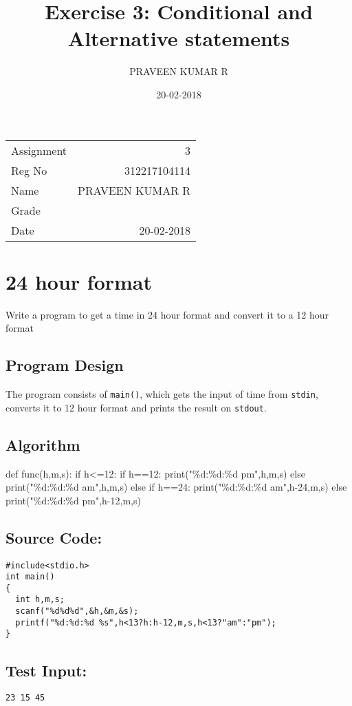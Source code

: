 \documentclass[11pt]{article}
\author{PRAVEEN KUMAR R}
\date{20-02-2018}
\title{Exercise 3: Conditional and Alternative statements}
\begin{document}
\maketitle
\begin{center}
\begin{tabular}{lr}
Assignment & 3\\
Reg No & 312217104114\\
Name & PRAVEEN KUMAR R\\
Grade & \\
Date & 20-02-2018\\
\end{tabular}
\end{center}


\section{24 hour format}
\label{sec-1}
Write a program to get a time in 24 hour format and convert it to a 12 hour format
\subsection*{Program Design}
\label{sec-1-1}
The program consists of \texttt{main()}, which gets the input of time from \texttt{stdin}, 
converts it to 12 hour format and prints the result on \texttt{stdout}.
\subsection*{Algorithm}
\label{sec-1-2}
def func(h,m,s):
  if h<=12:
    if h==12:
      print("\%d:\%d:\%d pm\n",h,m,s)
    else
      print("\%d:\%d:\%d am\n",h,m,s)
  else
    if h==24:
      print("\%d:\%d:\%d am\n",h-24,m,s)
    else
      print("\%d:\%d:\%d pm\n",h-12,m,s)

\subsection*{Source Code:}
\label{sec-1-3}

\begin{verbatim}
#include<stdio.h>
int main()
{
  int h,m,s;
  scanf("%d%d%d",&h,&m,&s);
  printf("%d:%d:%d %s",h<13?h:h-12,m,s,h<13?"am":"pm");  
}
\end{verbatim}

\subsection*{Test Input:}
\label{sec-1-4}
\begin{verbatim}
23 15 45
\end{verbatim}
\end{document}
